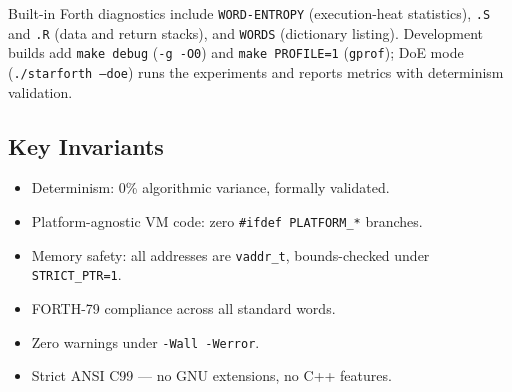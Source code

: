 Built-in Forth diagnostics include \texttt{WORD-ENTROPY} (execution-heat
statistics), \texttt{.S} and \texttt{.R} (data and return stacks), and
\texttt{WORDS} (dictionary listing). Development builds add \texttt{make debug}
(\texttt{-g -O0}) and \texttt{make PROFILE=1} (\texttt{gprof}); DoE mode
(\texttt{./starforth --doe}) runs the experiments and reports metrics with
determinism validation.

\subsection{Key Invariants}

\begin{itemize}
  \item Determinism: 0\% algorithmic variance, formally validated.
  \item Platform-agnostic VM code: zero \texttt{\#ifdef PLATFORM\_*} branches.
  \item Memory safety: all addresses are \texttt{vaddr\_t}, bounds-checked under
    \texttt{STRICT\_PTR=1}.
  \item FORTH-79 compliance across all standard words.
  \item Zero warnings under \texttt{-Wall -Werror}.
  \item Strict ANSI C99 --- no GNU extensions, no C++ features.
\end{itemize}
